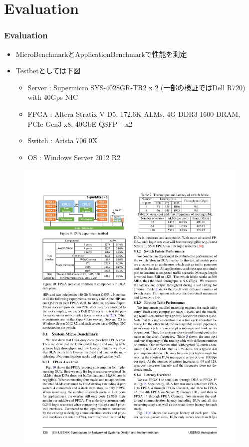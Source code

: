 \documentclass[dvipdfmx,9pt,notheorems]{beamer}
\theoremstyle{definition}
\begin{document}
\section{Evaluation}
\begin{frame}\frametitle{Evaluation}
	\begin{itemize}
			\item MicroBenchmarkとApplicationBenchmarkで性能を測定
			\item Testbetとしては下図
				\begin{itemize}
					\item Server : Supermicro SYS-4028GR-TR2 x 2 (一部の検証ではDell R720) with 40Gps NIC
					\item FPGA : Altera Stratix V D5, 172.6K ALMs, 4G DDR3-1600 DRAM, PCIe Gen3 x8, 40GbE QSFP+ x2
					\item Switch : Arista 706 0X
					\item OS : Windows Server 2012 R2
				\end{itemize}
	\end{itemize}
  \begin{figure}[htb]
		\includegraphics[scale=1.0]{fig/figure9.pdf}
  \end{figure}
\end{frame}
\end{document}
